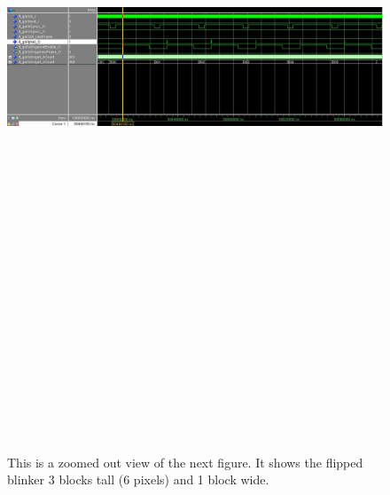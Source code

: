 \documentclass[twoside, letterpaper]{report}
\begin{document}
\begin{figure}
\centering
\includegraphics[angle=90, height=9in]{./media/blinker_2.jpg}
\caption{\label{fig:blinker2}This is a zoomed out view of the next figure. It shows the flipped blinker 3 blocks tall (6 pixels) and 1 block wide.}
\end{figure}
\end{document}
